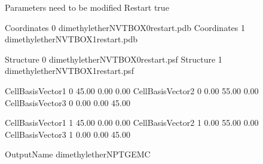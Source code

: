 \documentclass[letterpaper,10pt,english]{sphinxmanual}
\begin{document}
\begin{sphinxVerbatim}[commandchars=\\\{\}]
\PYGZsh{}\PYGZsh{}\PYGZsh{}\PYGZsh{}\PYGZsh{}\PYGZsh{}\PYGZsh{}\PYGZsh{}\PYGZsh{}\PYGZsh{}\PYGZsh{}\PYGZsh{}\PYGZsh{}\PYGZsh{}\PYGZsh{}\PYGZsh{}\PYGZsh{}\PYGZsh{}\PYGZsh{}\PYGZsh{}\PYGZsh{}\PYGZsh{}\PYGZsh{}\PYGZsh{}\PYGZsh{}\PYGZsh{}\PYGZsh{}\PYGZsh{}\PYGZsh{}\PYGZsh{}\PYGZsh{}\PYGZsh{}\PYGZsh{}\PYGZsh{}\PYGZsh{}\PYGZsh{}\PYGZsh{}\PYGZsh{}\PYGZsh{}\PYGZsh{}\PYGZsh{}\PYGZsh{}\PYGZsh{}\PYGZsh{}\PYGZsh{}\PYGZsh{}\PYGZsh{}\PYGZsh{}\PYGZsh{}\PYGZsh{}\PYGZsh{}\PYGZsh{}\PYGZsh{}\PYGZsh{}\PYGZsh{}\PYGZsh{}
\PYGZsh{} Parameters need to be modified
\PYGZsh{}\PYGZsh{}\PYGZsh{}\PYGZsh{}\PYGZsh{}\PYGZsh{}\PYGZsh{}\PYGZsh{}\PYGZsh{}\PYGZsh{}\PYGZsh{}\PYGZsh{}\PYGZsh{}\PYGZsh{}\PYGZsh{}\PYGZsh{}\PYGZsh{}\PYGZsh{}\PYGZsh{}\PYGZsh{}\PYGZsh{}\PYGZsh{}\PYGZsh{}\PYGZsh{}\PYGZsh{}\PYGZsh{}\PYGZsh{}\PYGZsh{}\PYGZsh{}\PYGZsh{}\PYGZsh{}\PYGZsh{}\PYGZsh{}\PYGZsh{}\PYGZsh{}\PYGZsh{}\PYGZsh{}\PYGZsh{}\PYGZsh{}\PYGZsh{}\PYGZsh{}\PYGZsh{}\PYGZsh{}\PYGZsh{}\PYGZsh{}\PYGZsh{}\PYGZsh{}\PYGZsh{}\PYGZsh{}\PYGZsh{}\PYGZsh{}\PYGZsh{}\PYGZsh{}\PYGZsh{}\PYGZsh{}\PYGZsh{}
Restart         true

Coordinates     0   dimethylether\PYGZus{}NVT\PYGZus{}BOX\PYGZus{}0\PYGZus{}restart.pdb
Coordinates     1   dimethylether\PYGZus{}NVT\PYGZus{}BOX\PYGZus{}1\PYGZus{}restart.pdb

Structure       0   dimethylether\PYGZus{}NVT\PYGZus{}BOX\PYGZus{}0\PYGZus{}restart.psf
Structure       1   dimethylether\PYGZus{}NVT\PYGZus{}BOX\PYGZus{}1\PYGZus{}restart.psf

\PYGZsh{}CellBasisVector1   0       45.00   0.00    0.00
\PYGZsh{}CellBasisVector2   0       0.00    55.00   0.00
\PYGZsh{}CellBasisVector3   0       0.00    0.00    45.00

\PYGZsh{}CellBasisVector1   1       45.00   0.00    0.00
\PYGZsh{}CellBasisVector2   1       0.00    55.00   0.00
\PYGZsh{}CellBasisVector3   1       0.00    0.00    45.00

OutputName          dimethylether\PYGZus{}NPT\PYGZus{}GEMC
\end{sphinxVerbatim}
\end{document}
